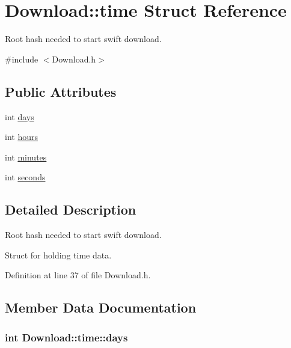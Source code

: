 \hypertarget{structDownload_1_1time}{
\section{Download::time Struct Reference}
\label{structDownload_1_1time}
}


Root hash needed to start swift download.  




{\ttfamily \#include $<$Download.h$>$}

\subsection*{Public Attributes}
\begin{DoxyCompactItemize}
\item 
int \hyperlink{structDownload_1_1time_af08741edc03dfdb3455b4535e0f04e3b}{days}
\item 
int \hyperlink{structDownload_1_1time_ab17b2214e46563a3d80ba305f4ea25d6}{hours}
\item 
int \hyperlink{structDownload_1_1time_a93f04fb31527a0f4a4f35b16052046dc}{minutes}
\item 
int \hyperlink{structDownload_1_1time_aaf6e3729c5ec9976d90b41caf8f352fd}{seconds}
\end{DoxyCompactItemize}


\subsection{Detailed Description}
Root hash needed to start swift download. 

Struct for holding time data. 

Definition at line 37 of file Download.h.



\subsection{Member Data Documentation}
\hypertarget{structDownload_1_1time_af08741edc03dfdb3455b4535e0f04e3b}{
\subsubsection[{days}]{\setlength{\rightskip}{0pt plus 5cm}int {\bf Download::time::days}}}
\label{structDownload_1_1time_af08741edc03dfdb3455b4535e0f04e3b}


